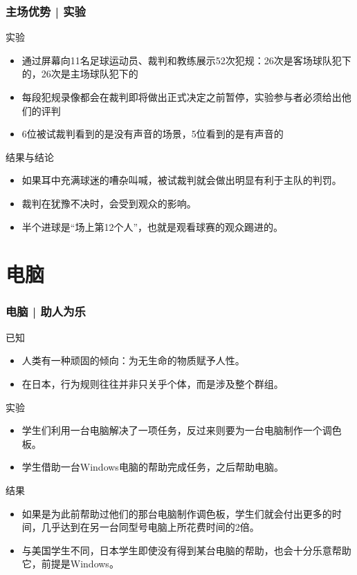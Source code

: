 \begin{frame}
  \frametitle{主场优势 | 实验}
  \begin{block}{实验}
    \begin{itemize}
      \item 通过屏幕向11名足球运动员、裁判和教练展示52次犯规：26次是客场球队犯下的，26次是主场球队犯下的
      \item 每段犯规录像都会在裁判即将做出正式决定之前暂停，实验参与者必须给出他们的评判
      \item 6位被试裁判看到的是没有声音的场景，5位看到的是有声音的
    \end{itemize}
  \end{block}
  \pause
  \begin{block}{结果与结论}
    \begin{itemize}
      \item 如果耳中充满球迷的嘈杂叫喊，被试裁判就会做出明显有利于主队的判罚。
      \item 裁判在犹豫不决时，会受到观众的影响。
      \item 半个进球是“场上第12个人”，也就是观看球赛的观众踢进的。
    \end{itemize}
  \end{block}
\end{frame}

\section{电脑}
\begin{frame}
  \frametitle{电脑 | 助人为乐}
  \begin{block}{已知}
    \begin{itemize}
      \item 人类有一种顽固的倾向：为无生命的物质赋予人性。
      \item 在日本，行为规则往往并非只关乎个体，而是涉及整个群组。
    \end{itemize}
  \end{block}
  \pause
  \begin{block}{实验}
    \begin{itemize}
      \item 学生们利用一台电脑解决了一项任务，反过来则要为一台电脑制作一个调色板。
      \item 学生借助一台Windows电脑的帮助完成任务，之后帮助电脑。
    \end{itemize}
  \end{block}
  \pause
  \begin{block}{结果}
    \begin{itemize}
      \item 如果是为此前帮助过他们的那台电脑制作调色板，学生们就会付出更多的时间，几乎达到在另一台同型号电脑上所花费时间的2倍。
      \item 与美国学生不同，日本学生即使没有得到某台电脑的帮助，也会十分乐意帮助它，前提是Windows。
    \end{itemize}
  \end{block}
\end{frame}

